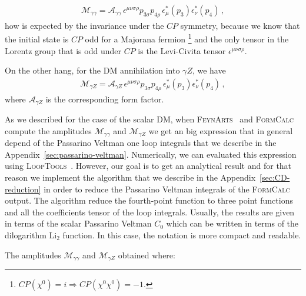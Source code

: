 \begin{align}
\label{eq:M-fermion-GG}
\mathcal{M}_{\gamma\gamma}=\mathcal{A}_{\gamma\gamma}\,\epsilon^{\mu\nu\sigma\rho}p_{3\sigma}p_{4\rho}\,\epsilon_{\mu}^*(p_3)\epsilon_{\nu}^*(p_4)\,,
\end{align}
%
how is expected by the invariance under the $CP$ symmetry, because we know that the initial state is $CP$ odd for a Majorana fermion \footnote{$ CP(\chi^0)=i \Rightarrow CP(\chi^0\chi^0)=-1$.} and the only tensor in the Lorentz group that is odd under $CP$ is the Levi-Civita tensor $\epsilon^{\mu\nu\sigma\rho}$.

On the other hang, for the DM annihilation into $\gamma Z$, we have
\begin{align}
\label{eq:M-fermion-GZ}
\mathcal{M}_{\gamma Z}=\mathcal{A}_{\gamma Z}\,\epsilon^{\mu\nu\sigma\rho}p_{3\sigma}p_{4\rho}\,\epsilon_{\mu}^*(p_3)\epsilon_{\nu}^*(p_4)\,,
\end{align}
%
where $\mathcal{A}_{\gamma Z}$ is the corresponding form factor.

As we described for the case of the scalar DM, when \textsc{FeynArts}~\cite{Hahn:2000kx} and \textsc{FormCalc}~\cite{Hahn:1998yk} compute the amplitudes $\mathcal{M}_{\gamma\gamma}$ and $\mathcal{M}_{\gamma Z}$ we get an big expression that in general depend of the Passarino Veltman one loop integrals that we describe in the Appendix~\ref{sec:passarino-veltman}. Numerically, we can evaluated this expression using \textsc{LoopTools}~\cite{Hahn:1998yk}. However, our goal is to get an analytical result and for that reason we implement the algorithm that we describe in the Appendix~\ref{sec:CD-reduction} in order to reduce the Passarino Veltman integrals of the \textsc{FormCalc} output.
%
The algorithm reduce the fourth-point function to three point functions and all the coefficients tensor of the loop integrals. Usually, the results are given in terms of the scalar Passarino Veltman $C_0$ which can be written in terms of the dilogarithm Li$_{2}$ function. In this case, the notation is more compact and readable.

The amplitudes $\mathcal{M}_{\gamma\gamma}$ and $\mathcal{M}_{\gamma Z}$ obtained where:


